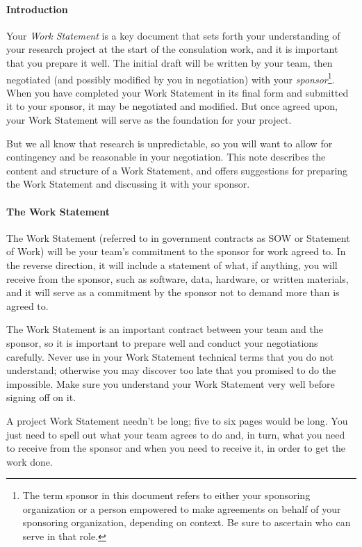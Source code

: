\documentclass[12pt]{article}
\begin{document}
\paragraph{Introduction} 
Your \emph{Work Statement} is a key document that sets forth your
understanding of your research project at the start of the consulation
work, and it is important that you prepare it well. The initial draft will be
written by your team, then negotiated (and possibly modified by you in
negotiation) with your \emph{sponsor}\footnote{The term sponsor in
  this document refers to either your sponsoring organization or a
  person empowered to make agreements on behalf of your sponsoring
  organization, depending on context. Be sure to ascertain who can
  serve in that role.}.
When you have completed your Work
Statement in its final form and submitted it to your sponsor, it may
be negotiated and modified. But once agreed upon, your Work Statement
will serve as the foundation for your project.

But we all know that research is unpredictable, so you will want to
allow for contingency and be reasonable in your negotiation. This note
describes the content and structure of a Work Statement,
and offers suggestions for preparing the Work Statement and discussing 
it with your sponsor.

\paragraph{The Work Statement}
The Work Statement (referred to in government contracts as SOW or
Statement of Work) will be your team's commitment to the sponsor for
work agreed to.  In the reverse direction, it will include a statement
of what, if anything, you will receive from the sponsor, such as
software, data, hardware, or written materials, and it will serve as a
commitment by the sponsor not to demand more than is agreed to.

The Work Statement is an important contract between your team and the
sponsor, so it is important to prepare well and conduct your
negotiations carefully. Never use in your Work Statement technical
terms that you do not understand; otherwise you may discover too late
that you promised to do the impossible. Make sure you understand your
Work Statement very well before signing off on it.

A project Work Statement needn't be long; five to six pages would be
long. You just need to spell out what your team agrees to do and, in
turn, what you need to receive from the sponsor and when you need to
receive it, in order to get the work done.
\end{document}
